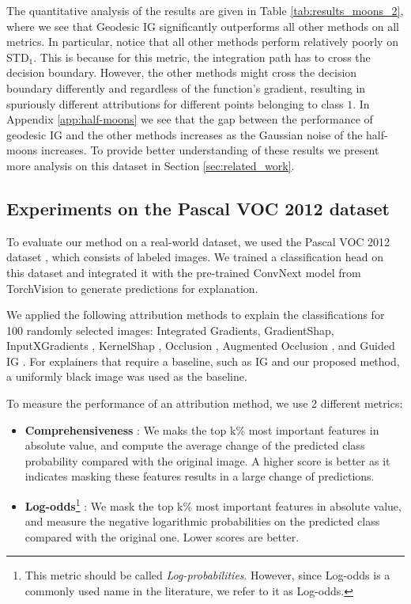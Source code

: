 The quantitative analysis of the results are given in Table \ref{tab:results_moons_2}, where we see that Geodesic IG significantly outperforms all other methods on all metrics. In particular, notice that all other methods perform relatively poorly on STD$_1$. This is because for this metric, the integration path has to cross the decision boundary. However, the other methods might cross the decision boundary differently and regardless of the function's gradient, resulting in spuriously different attributions for different points belonging to class $1$. In Appendix \ref{app:half-moons} we see that the gap between the performance of geodesic IG and the other methods increases as the Gaussian noise of the half-moons increases. To provide better understanding of these results we present more analysis on this dataset in Section \ref{sec:related_work}.

\subsection{Experiments on the Pascal VOC 2012 dataset}
\label{subsec:voc}

To evaluate our method on a real-world dataset, we used the Pascal VOC 2012 dataset \citep{pascal-voc-2012}, which consists of labeled images. We trained a classification head on this dataset and integrated it with the pre-trained ConvNext model \citep{liu2022convnet} from TorchVision to generate predictions for explanation.

We applied the following attribution methods to explain the classifications for 100 randomly selected images: Integrated Gradients, GradientShap, InputXGradients \citep{shrikumar2016not}, KernelShap \citep{lundberg2017unified}, Occlusion \citep{zeiler2014visualizing}, Augmented Occlusion \citep{tonekaboni2020went}, and Guided IG \citep{kapishnikov2021guided}.
For explainers that require a baseline, such as IG and our proposed method, a uniformly black image was used as the baseline.

To measure the performance of an attribution method, we use 2 different metrics:

\begin{itemize}
    \item \textbf{Comprehensiveness} \citep{deyoung2019eraser}: We maks the top k\% most important features in absolute value, and compute the average change of the predicted class probability compared with the original image. A higher score is better as it indicates masking these features results in a large change of predictions.

    \item \textbf{Log-odds}\footnote{This metric should be called \emph{Log-probabilities}. However, since Log-odds is a commonly used name in the literature, we refer to it as Log-odds.} \citep{shrikumar2017learning}: We mask the top k\% most important features in absolute value, and measure the negative logarithmic probabilities on the predicted class compared with the original one. Lower scores are better.
\end{itemize}

